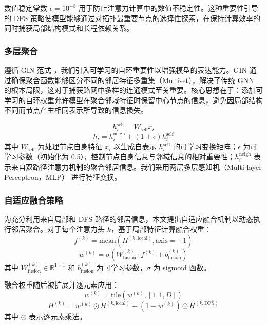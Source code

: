 数值稳定常数 $\epsilon = 10^{-8}$ 用于防止注意力计算中的数值不稳定性。这种重要性引导的 DFS 策略使模型能够通过对拓扑最重要节点的选择性探索，在保持计算效率的同时捕获局部结构模式和长程依赖关系。

\subsubsection{多层聚合}

遵循 GIN 范式 \cite{Xu2019}，我们引入可学习的自环重要性以增强模型的表达能力。GIN 通过确保聚合函数能够区分不同的邻居特征多重集（Multiset），解决了传统 GNN 的根本局限，这对于捕获路网中多样的连通模式至关重要。核心思想在于：添加可学习的自环权重允许模型在聚合邻域特征时保留中心节点的信息，避免因局部结构不同而节点产生相同表示所导致的信息损失。

\begin{equation}
h_i^{\text{self}} = W_{\text{self}}x_i
\label{eq:self_loop}
\end{equation}
\begin{equation}
h_i = h_i^{\text{neigh}} + (1+\epsilon)h_i^{\text{self}}
\label{eq:aggregation}
\end{equation}
其中 $W_{\text{self}}$ 为处理节点自身特征 $x_i$ 以生成自表示 $h_i^{\text{self}}$ 的可学习变换矩阵；$\epsilon$ 为可学习参数（初始化为 0.5），控制节点自身信息与邻域信息的相对重要性；$h_i^{\text{neigh}}$ 表示来自双路径注意力机制的聚合邻居信息。我们采用两层多层感知机（Multi-layer Perceptron，MLP）\cite{Goodfellow2016} 进行特征变换。

\subsubsection{自适应融合策略}

为充分利用来自局部和 DFS 路径的邻居信息，本文提出自适应融合机制以动态执行邻居聚合。对于每个注意力头 $k$，基于局部特征计算融合权重：
\begin{equation}
f^{(k)} = \text{mean}(H^{(k,\text{local})}, \text{axis}=-1)
\label{eq:fusion_feature}
\end{equation}
\begin{equation}
w^{(k)} = \sigma(W_{\text{fusion}}^{(k)} \cdot f^{(k)} + b_{\text{fusion}}^{(k)})
\label{eq:fusion_weight}
\end{equation}
其中 $W_{\text{fusion}}^{(k)} \in \mathbb{R}^{1 \times 1}$ 和 $b_{\text{fusion}}^{(k)}$ 为可学习参数，$\sigma$ 为 sigmoid 函数。

融合权重随后被扩展并逐元素应用：
\begin{equation}
w^{(k)} = \text{tile}(w^{(k)}, [1,1,D])
\label{eq:weight_expansion}
\end{equation}
\begin{equation}
H^{(k)} = w^{(k)} \odot H^{(k,\text{local})} + (1-w^{(k)}) \odot H^{(k,\text{DFS})}
\label{eq:adaptive_fusion}
\end{equation}
其中 $\odot$ 表示逐元素乘法。

